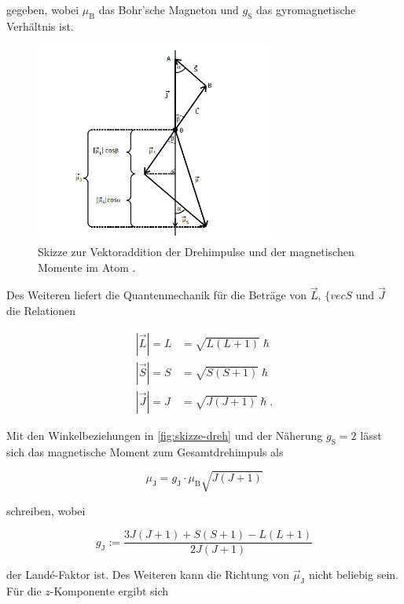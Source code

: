 gegeben, wobei $\mu_\text{B}$ das Bohr'sche Magneton und $g_\text{S}$ das gyromagnetische Verhältnis ist.

\begin{figure}
    \centering
    \includegraphics[width=0.70\textwidth]{content/skizze-drehimpuls.png}
    \caption{Skizze zur Vektoraddition der Drehimpulse und der magnetischen Momente im Atom \cite{V606}.}
    \label{fig:skizze-dreh}
\end{figure}

Des Weiteren liefert die Quantenmechanik für die Beträge von $\vec{L}$, $\{vec{S}$ und $\vec{J}$ die Relationen

\begin{align} 
    |\vec{L}| = L &= \sqrt{ L ( L + 1 ) } \hslash \\
    |\vec{S}| = S &= \sqrt{ S ( S + 1 ) } \hslash \\
    |\vec{J}| = J &= \sqrt{ J ( J + 1 ) } \hslash.
\end{align}

Mit den Winkelbeziehungen in \autoref{fig:skizze-dreh} und der Näherung $g_\text{S} = 2$ lässt sich das magnetische Moment zum Gesamtdrehimpuls als

\begin{equation}
    \label{eqn:magn-moment}
    \mu_\text{J} = g_\text{J} \cdot \mu_\text{B} \sqrt{J (J + 1)}
\end{equation}

schreiben, wobei 

\begin{equation}
    \label{eqn:lande}
    g_\text{J} := \frac{ 3 J (J+1) + S(S+1) - L(L+1) }{ 2 J (J +1) }
\end{equation}

der Landé-Faktor ist.
Des Weiteren kann die Richtung von $\vec{\mu}_\text{J}$ nicht beliebig sein. Für die $z$-Komponente ergibt sich


